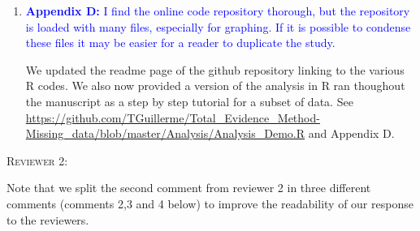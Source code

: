 \documentclass[12pt,letterpaper]{article}
\renewcommand{\section}[1]{%
\bigskip
\begin{center}
\begin{Large}
\normalfont\scshape #1
\medskip
\end{Large}
\end{center}}
\begin{document}
\begin{enumerate}
\item{\textcolor{blue}{\textbf{Appendix D:} I find the online code repository thorough, but the repository is loaded with many files, especially for graphing. If it is possible to condense these files it may be easier for a reader to duplicate the study.}}

We updated the readme page of the github repository linking to the various R codes.
We also now provided a version of the analysis in R ran thoughout the manuscript as a step by step tutorial for a subset of data.
See \url{https://github.com/TGuillerme/Total_Evidence_Method-Missing_data/blob/master/Analysis/Analysis_Demo.R} and Appendix D.

\end{enumerate}

\section{Reviewer 2:}
Note that we split the second comment from reviewer 2 in three different comments (comments 2,3 and 4 below) to improve the readability of our response to the reviewers.
\end{document}
